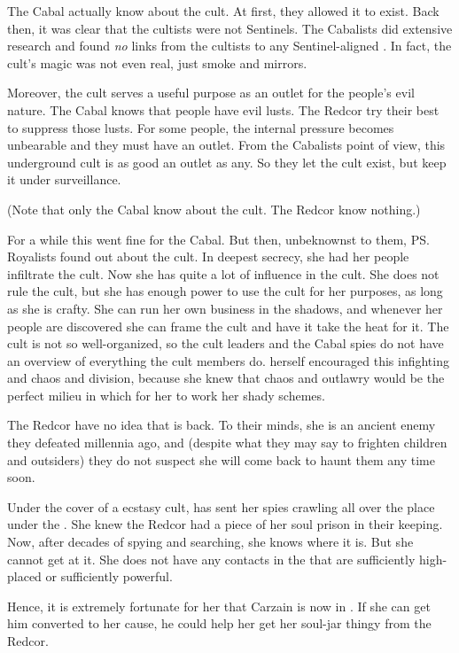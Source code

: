 \begin{garbage}
The Cabal actually know about the cult. 
At first, they allowed it to exist.
Back then, it was clear that the cultists were not Sentinels.
The Cabalists did extensive research and found \emph{no} links from the cultists to any Sentinel-aligned \matrices. 
In fact, the cult's magic was not even real, just smoke and mirrors. 

Moreover, the cult serves a useful purpose as an outlet for the people's evil nature. 
The Cabal knows that people have evil lusts. 
The Redcor try their best to suppress those lusts. 
For some people, the internal pressure becomes unbearable and they must have an outlet. 
From the Cabalists point of view, this underground cult is as good an outlet as any. 
So they let the cult exist, but keep it under surveillance. 

(Note that only the Cabal know about the cult. The Redcor know nothing.) 

For a while this went fine for the Cabal. 
But then, unbeknownst to them, \ps{\Shiaraid} Royalists found out about the cult. 
In deepest secrecy, she had her people infiltrate the cult. 
Now she has quite a lot of influence in the cult. 
She does not rule the cult, but she has enough power to use the cult for her purposes, as long as she is crafty. 
She can run her own business in the shadows, and whenever her people are discovered she can frame the cult and have it take the heat for it. 
The cult is not so well-organized, so the cult leaders and the Cabal spies do not have an overview of everything the cult members do. 
\Shiaraid{} herself encouraged this infighting and chaos and division, because she knew that chaos and outlawry would be the perfect milieu in which for her to work her shady schemes. 

The Redcor have no idea that \Shiaraid{} is back. 
To their minds, she is an ancient enemy they defeated millennia ago, and (despite what they may say to frighten children and outsiders) they do not suspect she will come back to haunt them any time soon. 

Under the cover of a  ecstasy cult, \Shiaraid{} has sent her spies crawling all over the place under the \TopazChateau{}. 
She knew the Redcor had a piece of her soul prison in their keeping. 
Now, after decades of spying and searching, she knows where it is. 
But she cannot get at it. 
She does not have any contacts in the \Chateau{} that are sufficiently high-placed or sufficiently powerful. 

Hence, it is extremely fortunate for her that Carzain is now in \Redce. 
If she can get him converted to her cause, he could help her get her soul-jar thingy from the Redcor. 







\end{garbage}
